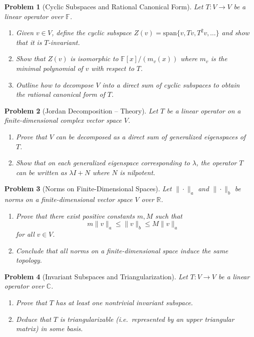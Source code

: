 \documentclass[11pt]{article}
\theoremstyle{upright}
\newtheorem{problem}{Problem}
\begin{document}
\begin{problem}[Cyclic Subspaces and Rational Canonical Form]
Let $T: V \to V$ be a linear operator over $\mathbb{F}$.
\begin{enumerate}
    \item Given $v \in V$, define the cyclic subspace $Z(v) = \mathrm{span}\{ v, T v, T^2 v, \dots \}$ and show that it is $T$-invariant.
    \item Show that $Z(v)$ is isomorphic to $\mathbb{F}[x]/(m_v(x))$ where $m_v$ is the minimal polynomial of $v$ with respect to $T$.
    \item Outline how to decompose $V$ into a direct sum of cyclic subspaces to obtain the rational canonical form of $T$.
\end{enumerate}
\end{problem}

\begin{problem}[Jordan Decomposition – Theory]
Let $T$ be a linear operator on a finite-dimensional complex vector space $V$.
\begin{enumerate}
    \item Prove that $V$ can be decomposed as a direct sum of generalized eigenspaces of $T$.
    \item Show that on each generalized eigenspace corresponding to $\lambda$, the operator $T$ can be written as $\lambda I + N$ where $N$ is nilpotent.
\end{enumerate}
\end{problem}

\begin{problem}[Norms on Finite-Dimensional Spaces]
Let $\|\cdot\|_a$ and $\|\cdot\|_b$ be norms on a finite-dimensional vector space $V$ over $\mathbb{R}$.
\begin{enumerate}
    \item Prove that there exist positive constants $m, M$ such that
    \[
    m \|v\|_a \le \|v\|_b \le M \|v\|_a
    \]
    for all $v \in V$.
    \item Conclude that all norms on a finite-dimensional space induce the same topology.
\end{enumerate}
\end{problem}

\begin{problem}[Invariant Subspaces and Triangularization]
Let $T: V \to V$ be a linear operator over $\mathbb{C}$.
\begin{enumerate}
    \item Prove that $T$ has at least one nontrivial invariant subspace.
    \item Deduce that $T$ is triangularizable (i.e.\ represented by an upper triangular matrix) in some basis.
\end{enumerate}
\end{problem}
\end{document}
